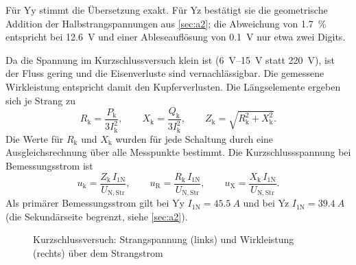 \documentclass[a4paper,11pt]{scrreprt}
\begin{document}
Für Yy stimmt die Übersetzung exakt. Für Yz bestätigt sie die geometrische Addition der Halbstrangspannungen aus \cref{sec:a2}; die Abweichung von \SI{1.7}{\percent} entspricht bei \SI{12.6}{V} und einer Ableseauflösung von \SI{0.1}{V} nur etwa zwei Digits.

Da die Spannung im Kurzschlussversuch klein ist (\SIrange{6}{15}{V} statt \SI{220}{V}), ist der Fluss gering und die Eisenverluste sind vernachlässigbar. Die gemessene Wirkleistung entspricht damit den Kupferverlusten. Die Längselemente ergeben sich je Strang zu
\begin{equation}
  R_\mathrm{k} = \frac{P_\mathrm{k}}{3 I_\mathrm{k}^2}, \qquad
  X_\mathrm{k} = \frac{Q_\mathrm{k}}{3 I_\mathrm{k}^2}, \qquad
  Z_\mathrm{k} = \sqrt{R_\mathrm{k}^2 + X_\mathrm{k}^2}.
\end{equation}
Die Werte für $R_\mathrm{k}$ und $X_\mathrm{k}$ wurden für jede Schaltung durch eine Ausgleichsrechnung über alle Messpunkte bestimmt. Die Kurzschlussspannung bei Bemessungsstrom ist
\begin{equation}
  u_\mathrm{k} = \frac{Z_\mathrm{k}\, I_\mathrm{1N}}{U_\mathrm{N,Str}}, \qquad u_\mathrm{R} = \frac{R_\mathrm{k}\, I_\mathrm{1N}}{U_\mathrm{N,Str}}, \qquad u_\mathrm{X} = \frac{X_\mathrm{k}\, I_\mathrm{1N}}{U_\mathrm{N,Str}}.
\end{equation}
Als primärer Bemessungsstrom gilt bei Yy $I_\mathrm{1N}=\SI{45.5}{A}$ und bei Yz $I_\mathrm{1N}=\SI{39.4}{A}$ (die Sekundärseite begrenzt, siehe \cref{sec:a2}).

\begin{figure}[H]
\centering
{}\hfill
{}
\caption{Kurzschlussversuch: Strangspannung (links) und Wirkleistung (rechts) über dem Strangstrom}
\label{fig:ks}
\end{figure}
\end{document}
